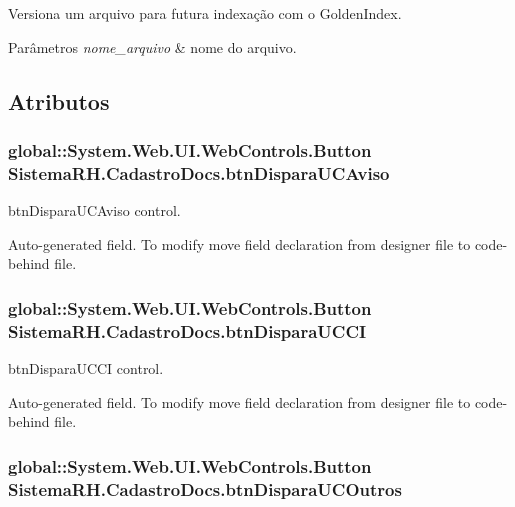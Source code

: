 Versiona um arquivo para futura indexação com o GoldenIndex. 


\begin{DoxyParams}{Parâmetros}
{\em nome\_\-arquivo} & nome do arquivo.\\
\hline
\end{DoxyParams}


\subsection{Atributos}
\hypertarget{class_sistema_r_h_1_1_cadastro_docs_a118d786546382312ccaa7eff9a7fdd31}{
\subsubsection[{btnDisparaUCAviso}]{\setlength{\rightskip}{0pt plus 5cm}global::System.Web.UI.WebControls.Button {\bf SistemaRH.CadastroDocs.btnDisparaUCAviso}}}
\label{class_sistema_r_h_1_1_cadastro_docs_a118d786546382312ccaa7eff9a7fdd31}


btnDisparaUCAviso control. 

Auto-\/generated field. To modify move field declaration from designer file to code-\/behind file. \hypertarget{class_sistema_r_h_1_1_cadastro_docs_af2bb49d67866ad385a6f806a07ccd59a}{
\subsubsection[{btnDisparaUCCI}]{\setlength{\rightskip}{0pt plus 5cm}global::System.Web.UI.WebControls.Button {\bf SistemaRH.CadastroDocs.btnDisparaUCCI}}}
\label{class_sistema_r_h_1_1_cadastro_docs_af2bb49d67866ad385a6f806a07ccd59a}


btnDisparaUCCI control. 

Auto-\/generated field. To modify move field declaration from designer file to code-\/behind file. \hypertarget{class_sistema_r_h_1_1_cadastro_docs_a6bab846c3322d28af670f85a884a48ad}{
\subsubsection[{btnDisparaUCOutros}]{\setlength{\rightskip}{0pt plus 5cm}global::System.Web.UI.WebControls.Button {\bf SistemaRH.CadastroDocs.btnDisparaUCOutros}}}
\label{class_sistema_r_h_1_1_cadastro_docs_a6bab846c3322d28af670f85a884a48ad}


